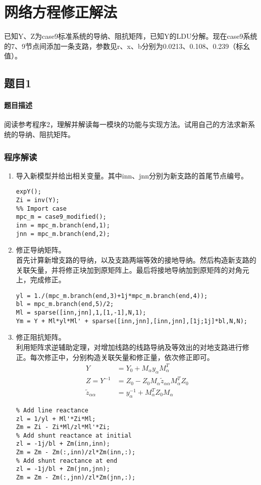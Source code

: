 \documentclass[a4paper,12pt]{article}
\begin{document}
    \section{网络方程修正解法}
    已知Y、Z为case9标准系统的导纳、阻抗矩阵，已知Y的LDU分解。现在case9系统的7、9节点间添加一条支路，参数见r、x、b分别为0.0213、0.108、0.239（标幺值）。
    \subsection{题目1}
    \paragraph{题目描述} 阅读参考程序2，理解并解读每一模块的功能与实现方法。试用自己的方法求新系统的导纳、阻抗矩阵。
    \subsubsection{程序解读}
    \begin{enumerate}
      \item 导入新模型并给出相关变量。其中inn、jnn分别为新支路的首尾节点编号。
      \begin{lstlisting}[style=Matlab-editor,basicstyle=\mlttfamily]
%% previous
expY();
Zi = inv(Y);
%% Import case
mpc_m = case9_modified();
inn = mpc_m.branch(end,1);
jnn = mpc_m.branch(end,2);
      \end{lstlisting}
      \item 修正导纳矩阵。\\
      首先计算新增支路的导纳，以及支路两端等效的接地导纳。然后构造新支路的关联矢量，并将修正块加到原矩阵上。最后将接地导纳加到原矩阵的对角元上，完成修正。
      \begin{lstlisting}[style=Matlab-editor,basicstyle=\mlttfamily]
%% Modify Y
yl = 1./(mpc_m.branch(end,3)+1j*mpc_m.branch(end,4));
bl = mpc_m.branch(end,5)/2;
Ml = sparse([inn,jnn],1,[1,-1],N,1);
Ym = Y + Ml*yl*Ml' + sparse([inn,jnn],[inn,jnn],[1j;1j]*bl,N,N);
      \end{lstlisting}
      \item 修正阻抗矩阵。\\
      利用矩阵求逆辅助定理，对增加线路的线路导纳及等效出的对地支路进行修正。每次修正中，分别构造关联矢量和修正量，依次修正即可。
      \begin{equation}
        \begin{aligned}
          Y &= Y_0+M_\alpha y_\alpha M_\alpha^T\\
          Z=Y^{-1}&= Z_0 -Z_0 M_\alpha \widetilde z_{\alpha\alpha} M_\alpha^T Z_0\\
          \widetilde z_{\alpha\alpha}&=y_\alpha^{-1}+M_\alpha^T Z_0 M_\alpha
        \end{aligned}
      \end{equation}
      \begin{lstlisting}[style=Matlab-editor,basicstyle=\mlttfamily]
%% Modify Z
% Add line reactance
zl = 1/yl + Ml'*Zi*Ml;
Zm = Zi - Zi*Ml/zl*Ml'*Zi;
% Add shunt reactance at initial
zl = -1j/bl + Zm(inn,inn);
Zm = Zm - Zm(:,inn)/zl*Zm(inn,:);
% Add shunt reactance at end
zl = -1j/bl + Zm(jnn,jnn);
Zm = Zm - Zm(:,jnn)/zl*Zm(jnn,:);
      \end{lstlisting}
    \end{enumerate}
\end{document}

